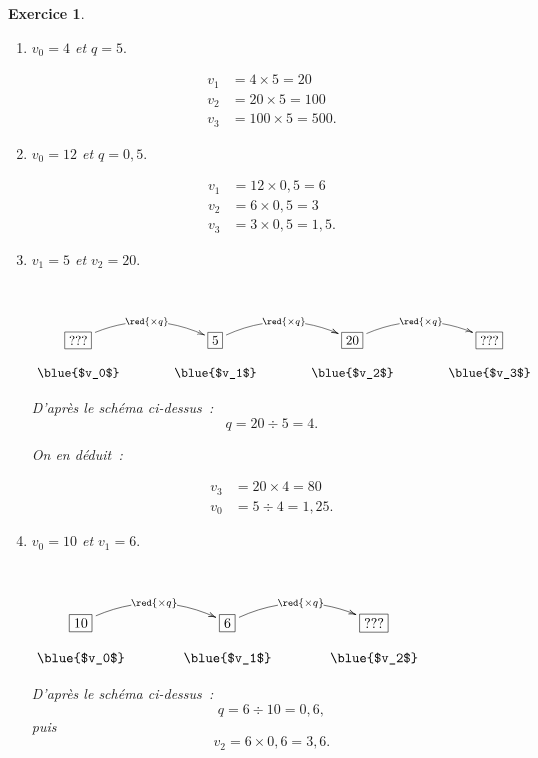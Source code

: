 \documentclass[10pt]{article}
\newtheorem{exo}{Exercice}
\begin{document}
\begin{exo}

\begin{enumerate}
\item $v_0=4$ et $q=5.$

\begin{align*}
v_1&=4\times 5=20\\
v_2&=20\times 5=100\\
v_3&=100\times 5=500.
\end{align*}

\item $v_0=12$ et $q=0,5.$

\begin{align*}
v_1&=12\times 0,5=6\\
v_2&=6\times 0,5=3\\
v_3&=3\times 0,5=1,5.
\end{align*}

\item $v_1=5$ et $v_2=20.$

~{}\begin{center}
    $\xymatrix@R=0.5pc@C=3pc{
    *+[F]+{???} \ar@/^0.5cm/[r]|{\red{\times q}} & 
    *+[F]+{5} \ar@/^0.5cm/[r]|{\red{\times q}} & *+[F]+{20} \ar@/^0.5cm/[r]|{\red{\times q}} & 
    *+[F]+{???} \\
    \txt{\blue{$v_0$}}&
    \txt{\blue{$v_1$}}&\txt{\blue{$v_2$}}&
    \txt{\blue{$v_3$}}
    }$
    \end{center}
    
    D'après le schéma ci-dessus~:
    \[q=20\div 5=4.\]
    
    On en déduit~:
    
    \begin{align*}
v_3&=20\times  4=80\\
v_0&=5\div 4=1,25.
\end{align*}

\item $v_0=10$ et $v_1=6.$

~{}\begin{center}
    $\xymatrix@R=0.5pc@C=3pc{
    *+[F]+{10} \ar@/^0.5cm/[r]|{\red{\times q}} & 
    *+[F]+{6} \ar@/^0.5cm/[r]|{\red{\times q}} & *+[F]+{???} \\
    \txt{\blue{$v_0$}}&
    \txt{\blue{$v_1$}}&\txt{\blue{$v_2$}}
    }$
    \end{center}
    
    D'après le schéma ci-dessus~:
    \[q=6\div 10=0,6,\] puis
    \[v_2=6\times 0,6=3,6.\]
    
    
\end{enumerate}
\end{exo}
\end{document}
